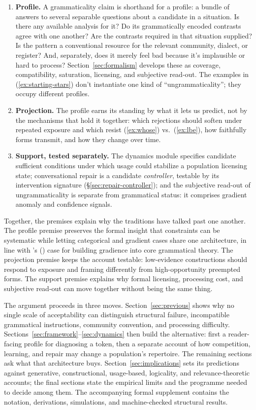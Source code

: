 \documentclass[12pt,letterpaper]{article}
\newcommand{\posscite}[1]{\citeauthor{#1}'s (\citeyear{#1})}
\begin{document}
\begin{enumerate}
\item \textbf{Profile.} A grammaticality claim is shorthand for a profile: a bundle of answers to several separable questions about a candidate in a situation. Is there any available analysis for it? Do its grammatically encoded contrasts agree with one another? Are the contrasts required in that situation supplied? Is the pattern a conventional resource for the relevant community, dialect, or register? And, separately, does it merely feel bad because it's implausible or hard to process? Section~\ref{sec:formalism} develops these as coverage, compatibility, saturation, licensing, and subjective read-out. The examples in (\ref{ex:starting-stars}) don't instantiate one kind of \enquote{ungrammaticality}; they occupy different profiles.
\item \textbf{Projection.} The profile earns its standing by what it lets us predict, not by the mechanisms that hold it together: which rejections should soften under repeated exposure and which resist (\ref{ex:whose}) vs.\ (\ref{ex:lbe}), how faithfully forms transmit, and how they change over time.
\item \textbf{Support, tested separately.} The dynamics module specifies candidate sufficient conditions under which usage could stabilize a population licensing state; conversational repair is a candidate \emph{controller}, testable by its intervention signature (\S\ref{sec:repair-controller}); and the subjective read-out of ungrammaticality is separate from grammatical status: it comprises gradient anomaly and confidence signals.
\end{enumerate}

Together, the premises explain why the traditions have talked past one another. The profile premise preserves the formal insight that constraints can be systematic while letting categorical and gradient cases share one architecture, in line with \posscite{francis2022} case for building gradience into core grammatical theory. The projection premise keeps the account testable: low-evidence constructions should respond to exposure and framing differently from high-opportunity preempted forms. The support premise explains why formal licensing, processing cost, and subjective read-out can move together without being the same thing.

The argument proceeds in three moves. Section~\ref{sec:previous} shows why no
single scale of acceptability can distinguish structural failure, incompatible
grammatical instructions, community convention, and processing difficulty.
Sections~\ref{sec:framework}--\ref{sec:dynamics} then build the alternative:
first a reader-facing profile for diagnosing a token, then a separate account of
how competition, learning, and repair may change a population's repertoire. The
remaining sections ask what that architecture buys. Section~\ref{sec:implications}
sets its predictions against generative, constructional, usage-based, logicality,
and relevance-theoretic accounts; the final sections state the empirical limits
and the programme needed to decide among them. The accompanying formal supplement
contains the notation, derivations, simulations, and machine-checked structural
results.
\end{document}
